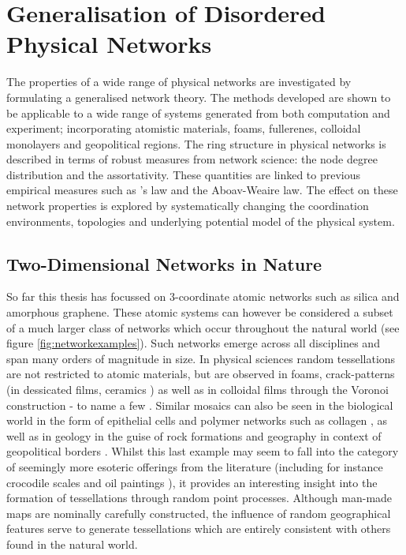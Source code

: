 \chapter{Generalisation of Disordered Physical Networks}
\label{ch:generalnetworks}

\begin{chapterabstract}
The properties of a wide range of physical \td{} networks are investigated by formulating a generalised network theory.
The methods developed are shown to be applicable to a wide range of systems generated from both computation and experiment; incorporating atomistic materials, foams, fullerenes, colloidal monolayers and geopolitical regions.
The ring structure in physical networks is described in terms of robust measures from network science: the node degree distribution and the assortativity.
These quantities are linked to previous empirical measures such as \lm's law and the Aboav\--Weaire law.
The effect on these network properties is explored by systematically changing the coordination environments, topologies and underlying potential model of the physical system.
\end{chapterabstract}

\section{Two\--Dimensional Networks in Nature}

So far this thesis has focussed on 3\--coordinate atomic networks such as silica and amorphous graphene.
These atomic systems can however be considered a subset of a much larger class of \td{} networks which occur throughout the natural world (see figure \ref{fig:networkexamples}).
Such networks emerge across all disciplines and span many orders of magnitude in size.
In physical sciences random tessellations are not restricted to atomic materials, but are observed in foams, crack\--patterns  (in dessicated films, ceramics \etc) as well as in colloidal films through the Voronoi construction \-- to name a few \cite{Durand2011,Tong2017,Noever1992,Ma2019,Earnshaw1994,Allain1995,Moncho-Jorda2000}.
Similar mosaics can also be seen in the biological world in the form of epithelial cells and polymer networks such as collagen \cite{Honda1978,Carter2017,Kim2016,Broedersz2014}, as well as in geology in the guise of rock formations and geography in context of geopolitical borders \cite{Weaire1984,Goehring2014,LeCaer1993}.
Whilst this last example may seem to fall into the category of seemingly more esoteric offerings from the literature (including for instance crocodile scales and oil paintings \cite{Milinkovitch2019,Flores2017}), it provides an interesting insight into the formation of tessellations through random point processes.
Although man\--made maps are nominally carefully constructed, the influence of random geographical features serve to generate tessellations which are entirely consistent with others found in the natural world.

